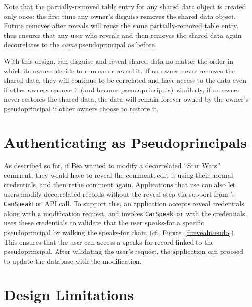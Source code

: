 Note that the partially-removed table entry for any shared data object is
created only once: the first time any owner's disguise removes the shared data
object. Future removes after reveals will reuse the same partially-removed table
entry.
%
\sys thus ensures that any user who reveals and then removes the shared data
again decorrelates to the \emph{same} pseudoprincipal as before.

%
With this design, \sys can disguise and reveal shared data no matter the order
in which its owners decide to remove or reveal it. If an owner never removes the
shared data, they will continue to be correlated and have access to the data
even if other owners remove it (and become pseudoprincipals); similarly, if an
owner never restores the shared data, the data will remain forever owned by the
owner's pseudoprincipal if other owners choose to restore it.
%





\section{Authenticating as Pseudoprincipals}

As described so far, if Bea wanted to modify a decorrelated ``Star Wars''
comment, they would have to reveal the comment, edit it using their normal
credentials, and then re\xx the comment again.
%
Applications that use \sys can also let users modify decorrelated records
without the reveal step via support from \sys's \texttt{CanSpeakFor} API call.
%
To support this, an application accepts reveal credentials along with a
modification request, and invokes \texttt{CanSpeakFor} with the credentials.
\sys uses these credentials to validate that the user speaks-for a specific
pseudoprincipal by walking the speaks-for chain (cf.\
Figure~\ref{f:revealpseudo}). This ensures that the user can access a speaks-for
record linked to the pseudoprincipal. After validating the user's request,
the application can proceed to 
update the database with the modification.
%
%

\section{Design Limitations}
\label{s:design:limits}

